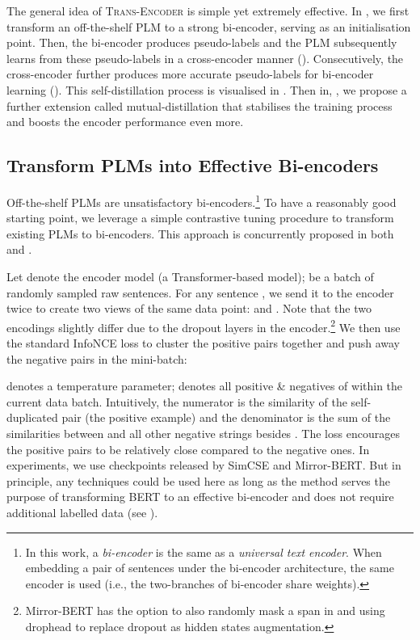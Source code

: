 \documentclass{article} \usepackage{iclr2021_conference,times}
\newcommand{\modelname}{\textsc{Trans-Encoder}\xspace}
\begin{document}
The general idea of \modelname is simple yet extremely effective. 
In , we first transform an off-the-shelf PLM to a strong bi-encoder, serving as an initialisation point. 
Then, the bi-encoder produces pseudo-labels and the PLM subsequently learns from these pseudo-labels in a cross-encoder manner (). 
Consecutively, the cross-encoder further produces more accurate pseudo-labels for bi-encoder learning (). 
This self-distillation process is visualised in . 
Then in, , we propose a further extension called mutual-distillation that stabilises the training process and boosts the encoder performance even more.

\subsection{Transform PLMs into Effective Bi-encoders}\label{sec:mirror_bert}
Off-the-shelf PLMs are unsatisfactory bi-encoders.\footnote{In this work, a \textit{bi-encoder} is the same as a \textit{universal text encoder}. When embedding a pair of sentences under the bi-encoder architecture, the same encoder is used (i.e., the two-branches of bi-encoder share weights).} 
To have a reasonably good starting point, we leverage a simple contrastive tuning procedure to transform existing PLMs to bi-encoders. 
This approach is concurrently proposed in both \citep{liu2021fast} and \citep{gao2021simcse}. 

Let  denote the encoder model (a Transformer-based model);  be a batch of randomly sampled raw sentences. 
For any sentence , we send it to the encoder twice to create two views of the same data point:  and . 
Note that the two encodings slightly differ due to the dropout layers in the encoder.\footnote{Mirror-BERT has the option to also randomly mask a span in  and using drophead \citep{zhou-etal-2020-scheduled} to replace dropout as hidden states augmentation.}
We then use the standard InfoNCE loss \citep{oord2018representation} to cluster the positive pairs together and push away the negative pairs in the mini-batch:

\vspace{-2mm}



 denotes a temperature parameter;  denotes all positive \& negatives of  within the current data batch. Intuitively, the numerator is the similarity of the self-duplicated pair (the positive example) and the denominator is the sum of the similarities between  and all other negative strings besides . The loss encourages the positive pairs to be relatively close compared to the negative ones. In experiments, we use checkpoints released by SimCSE and Mirror-BERT. But in principle, any techniques could be used here as long as the method serves the purpose of transforming BERT to an effective bi-encoder and does not require additional labelled data (see ).
\end{document}
